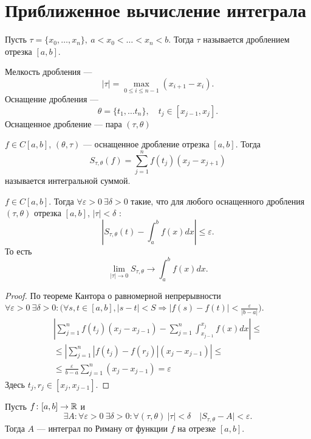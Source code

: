 \section{Приближенное вычисление интеграла}
\begin{defn}[Дробление]
    Пусть $ \tau = \{x_0, \ldots , x_{n}\}, ~ a < x_0 < \ldots < x_{n}< b$. Тогда $ \tau $ называется {\sf дроблением отрезка} $ [a, b]$. 

    {\sf Мелкость дробления} --- \[
	\left| \tau \right| = \max_{0 \le i \le n-1} (x_{i+1} - x_i)
    .\]  
    {\sf Оснащение дробления} --- \[
	\theta = \{t_1, \ldots t_n\}, \quad t_j \in [x_{j-1}, x_j]
    .\]     
    {\sf Оснащенное дробление} --- пара $ ( \tau,\theta )$ 
\end{defn}
\begin{defn}
    $ f \in C[a, b]$, $ (\theta, \tau )$ --- оснащенное дробление отрезка $ [a, b]$. Тогда \[
	S_{\tau, \theta} (f) = \sum_{j=1}^{n} f(t_j)(x_j-x_{j+1})
    \] 
называется {\sf интегральной суммой}. 
\end{defn}
\begin{thm}
    $ f \in  C[a, b]$. Тогда $ \forall \varepsilon >0 ~ \exists \delta >0$ такие, что для любого оснащенного дробления $( \tau , \theta)$ отрезка $ [a, b]$, $ \lvert \tau \rvert < \delta $ :
    \[
	\left| S_{\tau, \theta}(t) - \int_{a}^{b} f(x) dx  \right| \le \varepsilon 
    .\] 
    То есть 
    \[
	\lim_{\lvert \tau  \rvert \to 0} S_{\tau, \theta} \to  \int_{a}^{b} f(x)dx 
    .\] 
\end{thm}
\begin{proof}
    По теореме Кантора о равномерной непрерывности $ \forall \varepsilon >0 ~ \exists \delta >0\colon \bigl( \forall s, t \in  [a , b], \lvert s-t \rvert < S \Longrightarrow \lvert f(s) - f(t) \rvert < \frac{ \varepsilon }{\lvert b-a \rvert } \bigr)$.
    \begin{align*}
    \left| \sum_{j=1}^{n} f(t_j) (x_j-x_{j-1}) - \sum_{j=1}^{n}  \int_{x_{j-1}}^{x_j} f(x)dx  \right| \le \\
\le \left| \sum_{j=1}^{n} \left| f(t_j) - f(r_j) \right| (x_j - x_{j-1}) \right| \le \\
\le \frac{ \varepsilon }{b-a} \sum_{j=1}^{n} (x_j - x_{j-1}) = \varepsilon 
    \end{align*}
    Здесь $ t_j, r_j \in  [x_j, x_{j-1}]$.
\end{proof}
\begin{defn}
    Пусть $ f\colon [a, b] \to \mathbb{R}$ и 
   $$
   \exists A\colon \forall \varepsilon >0 ~ \exists \delta >0 \colon \forall (\tau , \theta) ~ \lvert \tau  \rvert < \delta  \quad \lvert S_{\tau , \theta} - A\rvert  < \varepsilon 
   .$$
   Тогда $ A$ ---  {\sf интеграл по Риману от функции $ f$ на отрезке  $ [a, b]$}.  
\end{defn}
